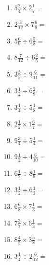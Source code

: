 \documentclass[12pt]{article}
\begin{document}
\begin{enumerate}
\item \large $ 5 \frac{2}{4} \times 2 \frac{1}{7} = $ \vspace{1.6cm}
\item \large $ 2 \frac{3}{12} \times 7 \frac{6}{9} = $ \vspace{1.6cm}
\item \large $ 5 \frac{6}{9} \div 6 \frac{5}{8} = $ \vspace{1.6cm}
\item \large $ 8 \frac{7}{12} \div 6 \frac{2}{5} = $ \vspace{1.6cm}
\item \large $ 3 \frac{3}{5} \div 9 \frac{6}{11} = $ \vspace{1.6cm}
\item \large $ 3 \frac{1}{2} \div 6 \frac{2}{9} = $ \vspace{1.6cm}
\newpage
\item \large $ 3 \frac{1}{4} \div 5 \frac{1}{8} = $ \vspace{1.6cm}
\item \large $ 2 \frac{1}{2} \times 1 \frac{6}{7} = $ \vspace{1.6cm}
\item \large $ 9 \frac{3}{4} \div 5 \frac{1}{4} = $ \vspace{1.6cm}
\item \large $ 9 \frac{1}{2} \div 4 \frac{6}{10} = $ \vspace{1.6cm}
\item \large $ 6 \frac{1}{2} \div 8 \frac{1}{9} = $ \vspace{1.6cm}
\item \large $ 3 \frac{1}{2} \div 6 \frac{1}{3} = $ \vspace{1.6cm}
\item \large $ 6 \frac{6}{8} \times 7 \frac{1}{3} = $ \vspace{1.6cm}
\item \large $ 7 \frac{3}{7} \times 6 \frac{1}{3} = $ \vspace{1.6cm}
\item \large $ 8 \frac{4}{5} \times 3 \frac{5}{8} = $ \vspace{1.6cm}
\item \large $ 3 \frac{1}{4} \div 2 \frac{6}{12} = $ \vspace{1.6cm}
\end{enumerate}
\newpage
\end{document}
